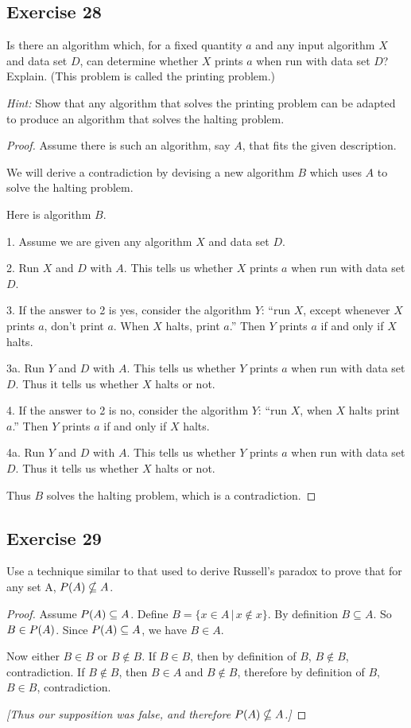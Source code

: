 \documentclass[14pt]{extarticle}
\let\mathscr\relax
\newcommand{\ps}{\mathscr{P}}
\begin{document}
\subsection{Exercise 28}
Is there an algorithm which, for a fixed quantity $a$ and any input algorithm $X$ and data set $D$, can determine
whether $X$ prints $a$ when run with data set $D$? Explain. (This problem is called the printing problem.)

{\it Hint:} Show that any algorithm that solves the printing problem can be adapted to produce an algorithm
that solves the halting problem.

\begin{proof}
  Assume there is such an algorithm, say $A$, that fits the given description.

  We will derive a contradiction by devising a new algorithm $B$ which uses $A$ to solve the halting problem.

  Here is algorithm $B$.

  1. Assume we are given any algorithm $X$ and data set $D$.

  2. Run $X$ and $D$ with $A$. This tells us whether $X$ prints $a$ when run with data set $D$.

  3. If the answer to 2 is yes, consider the algorithm $Y$: ``run $X$, except whenever $X$ prints $a$, don't print $a$.
  When $X$ halts, print $a$.'' Then $Y$ prints $a$ if and only if $X$ halts.

  3a. Run $Y$ and $D$ with $A$. This tells us whether $Y$ prints $a$ when run with data set $D$. Thus it tells us
  whether $X$ halts or not.

  4. If the answer to 2 is no, consider the algorithm $Y$: ``run $X$, when $X$ halts print $a$.'' Then $Y$ prints $a$
  if and only if $X$ halts.

  4a. Run $Y$ and $D$ with $A$. This tells us whether $Y$ prints $a$ when run with data set $D$. Thus it tells us
  whether $X$ halts or not.

  Thus $B$ solves the halting problem, which is a contradiction.
\end{proof}

\subsection{Exercise 29}
Use a technique similar to that used to derive Russell’s paradox to prove that for any set A, \(\ps(A) \nsubseteq A\).

\begin{proof}
  Assume \(\ps(A) \subseteq A\). Define \(B = \{x \in A \, | \, x \notin x\}\). By definition \(B \subseteq A\).
  So \(B \in \ps(A)\). Since \(\ps(A) \subseteq A\), we have \(B \in A\).

  Now either $B \in B$ or $B \notin B$. If $B \in B$, then by definition of $B$, \(B \notin B\), contradiction.
  If \(B \notin B\), then \(B \in A\) and \(B \notin B\), therefore by definition of $B$, \(B \in B\), contradiction.

    {\it [Thus our supposition was false, and therefore \(\ps(A) \nsubseteq A\).]}
\end{proof}
\end{document}

